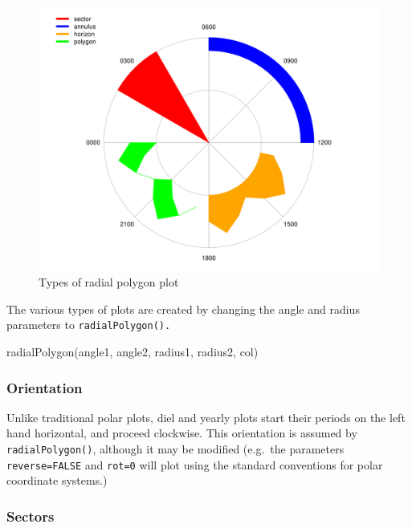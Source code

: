 \documentclass[
]{book}
\newenvironment{Shaded}{\begin{snugshade}}{\end{snugshade}}
\newcommand{\FunctionTok}[1]{\textcolor[rgb]{0.00,0.00,0.00}{#1}}
\newcommand{\NormalTok}[1]{#1}
\begin{document}
\begin{figure}

{\centering \includegraphics[width=0.9\linewidth]{_main_files/figure-latex/radialPolygon-types-1} 

}

\caption{Types of radial polygon plot}\label{fig:radialPolygon-types}
\end{figure}

The various types of plots are created by changing the angle and radius parameters to \texttt{radialPolygon().}

\begin{Shaded}
\begin{Highlighting}[]
\FunctionTok{radialPolygon}\NormalTok{(angle1, angle2, radius1, radius2, col)}
\end{Highlighting}
\end{Shaded}

\hypertarget{orientation}{%
\subsubsection{Orientation}\label{orientation}}

Unlike traditional polar plots, diel and yearly plots start their periods on the left hand horizontal, and proceed clockwise. This orientation is assumed by \texttt{radialPolygon()}, although it may be modified (e.g.~the parameters \texttt{reverse=FALSE} and \texttt{rot=0} will plot using the standard conventions for polar coordinate systems.)

\hypertarget{sectors}{%
\subsubsection{Sectors}\label{sectors}}
\end{document}
